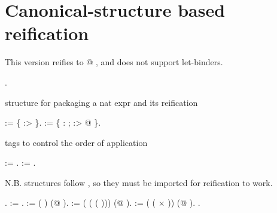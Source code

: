 \begin{coqdoccode}
\end{coqdoccode}
\section{Canonical-structure based reification}

 This version reifies to @ , and does not support
    let-binders. \begin{coqdoccode}
\coqdocemptyline
\coqdocnoindent
{}  .\coqdoceol
\coqdocemptyline
\end{coqdoccode}
structure for packaging a nat expr and its reification \begin{coqdoccode}
\coqdocemptyline
\coqdocnoindent
{}  :=  \{  :>  \}.\coqdoceol
\coqdocnoindent
{}  :=\coqdoceol
\coqdocindent{1.00em}
 \{  :  ;  :> @  \}.\coqdoceol
\coqdocemptyline
\end{coqdoccode}
tags to control the order of application \begin{coqdoccode}
\coqdocnoindent
{}  := .\coqdoceol
\coqdocnoindent
{}  := .\coqdoceol
\coqdocemptyline
\end{coqdoccode}
N.B.  structures follow , so they must be
    imported for reification to work. \begin{coqdoccode}
\coqdocemptyline
\coqdocnoindent
{}  .\coqdoceol
\coqdocindent{1.00em}
    :=  .\coqdoceol
\coqdocindent{1.00em}
  \coqdoceol
\coqdocindent{2.00em}
:=  ( ) (@ ).\coqdoceol
\coqdocindent{1.00em}
   \coqdoceol
\coqdocindent{2.00em}
:=  ( ( ( ))) (@  ).\coqdoceol
\coqdocindent{1.00em}
    \coqdoceol
\coqdocindent{2.00em}
:=  ( (  \ensuremath{\times}  ))\coqdoceol
\coqdocindent{6.50em}
(@   ).\coqdoceol
\coqdocnoindent
{} .\coqdoceol
\coqdocemptyline
\end{coqdoccode}
